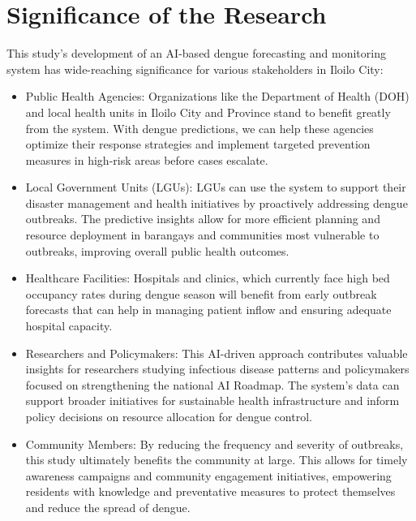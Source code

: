 \section{Significance of the Research}
\label{sec:significance}

This study’s development of an AI-based dengue forecasting and monitoring system has wide-reaching significance for various stakeholders in Iloilo City:

\begin{itemize}
	\item  Public Health Agencies: Organizations like the Department of Health (DOH) and local health units in Iloilo City and Province stand to benefit greatly from the system. With dengue predictions, we can help these agencies optimize their response strategies and implement targeted prevention measures in high-risk areas before cases escalate.
\end{itemize}

\begin{itemize} 
	\item Local Government Units (LGUs): LGUs can use the system to support their disaster management and health initiatives by proactively addressing dengue outbreaks. The predictive insights allow for more efficient planning and resource deployment in barangays and communities most vulnerable to outbreaks, improving overall public health outcomes.
\end{itemize}


\begin{itemize} 
	\item Healthcare Facilities: Hospitals and clinics, which currently face high bed occupancy rates during dengue season will benefit from early outbreak forecasts that can help in managing patient inflow and ensuring adequate hospital capacity. 
\end{itemize}


\begin{itemize} 
	\item Researchers and Policymakers: This AI-driven approach contributes valuable insights for researchers studying infectious disease patterns and policymakers focused on strengthening the national AI Roadmap. The system's data can support broader initiatives for sustainable health infrastructure and inform policy decisions on resource allocation for dengue control.
\end{itemize}


\begin{itemize} 
	\item Community Members: By reducing the frequency and severity of outbreaks, this study ultimately benefits the community at large. This allows for timely awareness campaigns and community engagement initiatives, empowering residents with knowledge and preventative measures to protect themselves and reduce the spread of dengue.
\end{itemize}

